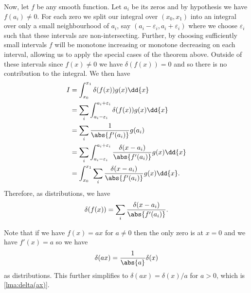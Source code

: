 \documentclass[fleqn]{NotesClass}
\begin{document}
    Now, let \(f\) be any smooth function.
    Let \(a_i\) be its zeros and by hypothesis we have \(f(a_i) \ne 0\).
    For each zero we split our integral over \((x_0, x_1)\) into an integral over only a small neighbourhood of \(a_i\), say \((a_i - \varepsilon_i, a_i + \varepsilon_i)\) where we choose \(\varepsilon_i\) such that these intervals are non-intersecting.
    Further, by choosing sufficiently small intervals \(f\) will be monotone increasing or monotone decreasing on each interval, allowing us to apply the special cases of the theorem above.
    Outside of these intervals since \(f(x) \ne 0\) we have \(\delta(f(x)) = 0\) and so there is no contribution to the integral.
    We then have
    \begin{align}
        I &= \int_{x_0}^{x_1} \delta(f(x)) g(x) \dd{x}\\
        &= \sum_{i} \int_{a_i - \varepsilon_i}^{a_i + \varepsilon_i} \delta(f(x)) g(x) \dd{x}\\
        &= \sum_{i} \frac{1}{\abs{f'(a_i)}} g(a_i)\\
        &= \sum_{i} \int_{a_i - \varepsilon_i}^{a_i + \varepsilon_i} \frac{\delta(x - a_i)}{\abs{f'(a_i)}} g(x) \dd{x}\\
        &= \int_{x_0}^{x_1} \sum_{i} \frac{\delta(x - a_i)}{\abs{f'(a_i)}} g(x) \dd{x}.
    \end{align}
    Therefore, as distributions, we have
    \begin{equation}
        \delta(f(x)) = \sum_i \frac{\delta(x - a_i)}{\abs{f'(a_i)}}.
    \end{equation}

    Note that if we have \(f(x) = ax\) for \(a \ne 0\) then the only zero is at \(x = 0\) and we have \(f'(x) = a\) so we have
    \begin{equation}
        \delta(ax) = \frac{1}{\abs{a}} \delta(x)
    \end{equation}
    as distributions.
    This further simplifies to \(\delta(ax) = \delta(x)/a\) for \(a > 0\), which is \cref{lma:delta(ax)}.
    
\end{document}
